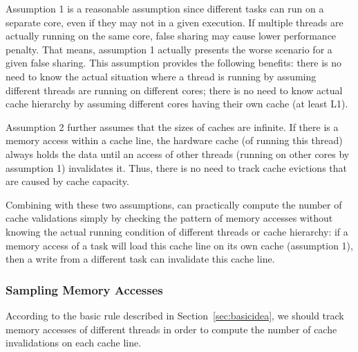 Assumption 1 is a reasonable assumption since different tasks can run on a separate core, even if they may not in a given execution.  If multiple threads are actually running on the same core, false sharing may cause lower performance penalty. That means, assumption 1 actually presents the worse scenario for a given false sharing. This assumption provides the following benefits: there is no need to know the actual situation where a thread is running by assuming different threads are running on different cores; there is no need to know actual cache hierarchy by assuming different cores having their own cache (at least L1). 

Assumption 2 further assumes that the sizes of caches are infinite. If there is a memory access within a cache line, the hardware cache (of running this thread) always holds the data until an access of other threads (running on other cores by assumption 1) invalidates it. Thus, there is no need to track cache evictions that are caused by cache capacity. 

Combining with these two assumptions, \cheetah{} can practically compute the number of cache validations simply by checking the pattern of memory accesses without knowing the actual running condition of different threads or cache hierarchy: if a memory access of a task will load this cache line on its own cache (assumption 1), then a write from a different task can invalidate this cache line. 

 


\subsubsection{Sampling Memory Accesses}
\label{sec:perfcounter}

According to the basic rule described in Section~\ref{sec:basicidea}, we should track memory accesses of different threads in order to compute the number of cache invalidations on each cache line. 

